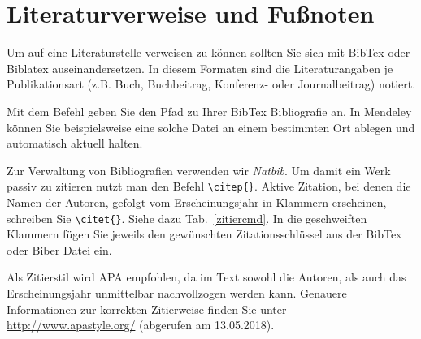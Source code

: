 \documentclass[twoside,bibliography=totoc,openany]{fumi}
\begin{document}
 

\section{Literaturverweise und Fußnoten}
Um auf eine Literaturstelle verweisen zu können sollten Sie sich mit BibTex oder Biblatex auseinandersetzen. In diesem Formaten sind die Literaturangaben je Publikationsart (z.B. Buch, Buchbeitrag, Konferenz- oder Journalbeitrag) notiert. 

Mit dem  Befehl \verb|| geben Sie den Pfad zu Ihrer BibTex Bibliografie an. In Mendeley können Sie beispielsweise eine solche Datei an einem bestimmten Ort ablegen und automatisch aktuell halten.

Zur Verwaltung von Bibliografien verwenden wir \textit{Natbib}. Um damit ein Werk passiv zu zitieren nutzt man den Befehl \verb|\citep{}|. Aktive Zitation, bei denen die Namen der Autoren, gefolgt vom Erscheinungsjahr in Klammern erscheinen, schreiben Sie \verb|\citet{}|. Siehe dazu Tab.~\ref{zitiercmd}. In die geschweiften Klammern fügen Sie jeweils den gewünschten Zitationsschlüssel aus der BibTex oder Biber Datei ein. 

Als Zitierstil wird APA empfohlen, da im Text sowohl die Autoren, als auch das Erscheinungsjahr unmittelbar nachvollzogen werden kann. Genauere Informationen zur korrekten Zitierweise finden Sie unter \url{http://www.apastyle.org/} (abgerufen am 13.05.2018).
\end{document}
